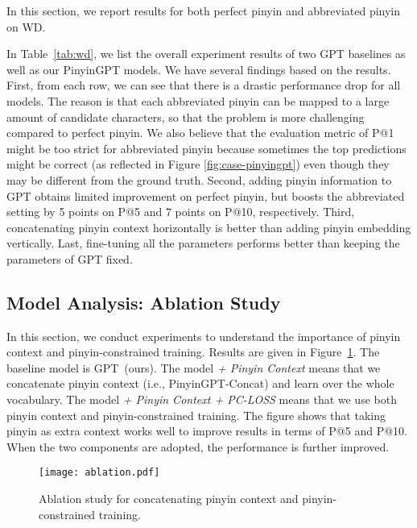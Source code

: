 
In this section, we report results for both perfect pinyin and abbreviated pinyin on WD. 

In Table~\ref{tab:wd}, we list the overall experiment results of two GPT baselines as well as our PinyinGPT models.
We have several findings based on the results.
First, from each row, we can see that there is a drastic performance drop for all models.
The reason is that each abbreviated pinyin can be mapped to a large amount of candidate characters, so that the problem is more challenging compared to perfect pinyin.
We also believe that the evaluation metric of P@1 might be too strict for abbreviated pinyin because sometimes the top predictions might be correct (as reflected in Figure \ref{fig:case-pinyingpt}) even though they may be different from the ground truth.
Second, adding pinyin information to GPT obtains limited improvement on perfect pinyin, but boosts the abbreviated setting by 5 points on P@5 and 7 points on P@10, respectively.
Third, concatenating pinyin context horizontally is better than adding pinyin embedding vertically.
Last, fine-tuning all the parameters performs better than keeping the parameters of GPT fixed.




\subsection{Model Analysis: Ablation Study}
In this section, we conduct experiments to understand the importance of pinyin context and pinyin-constrained training.
Results are given in Figure~\ref{fig:ablation}.
The baseline model is GPT~(ours).
The model \emph{+ Pinyin Context} means that we concatenate pinyin context (i.e., PinyinGPT-Concat) and learn over the whole vocabulary.
The model \emph{+ Pinyin Context + PC-LOSS} means that we use both pinyin context and  pinyin-constrained training.
The figure shows that taking pinyin as extra context works well to improve results in terms of P@5 and P@10.
When the two components are adopted, the performance is further improved.

\begin{figure}[!ht]
\centering
\texttt{[image: ablation.pdf]}
\caption{Ablation study for concatenating pinyin context and pinyin-constrained training.}
\label{fig:ablation}
\end{figure}


